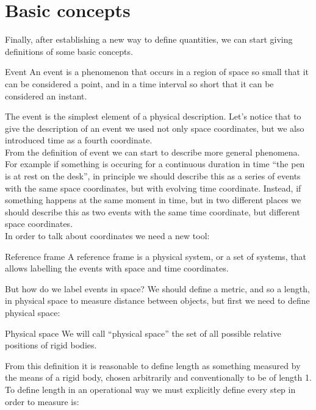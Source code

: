 \section{Basic concepts}
Finally, after establishing a new way to define quantities, we can start giving definitions of some basic concepts.
\begin{definition}{Event}
  An event is a phenomenon that occurs in a region of space so small that it can be considered a point, and in a time interval so short that it can be considered an instant.
\end{definition}
The event is the simplest element of a physical description. Let's notice that to give the description of an event we used not only space coordinates, but we also introduced time as a fourth coordinate.\\
From the definition of event we can start to describe more general phenomena. For example if something is occuring for a continuous duration in time ``the pen is at rest on the desk'', in principle we should describe this as a series of events with the same space coordinates, but with evolving time coordinate. Instead, if something happens at the same moment in time, but in two different places we should describe this as two events with the same time coordinate, but different space coordinates.\\
In order to talk about coordinates we need a new tool:
\begin{definition}{Reference frame}
  A reference frame is a physical system, or a set of systems, that allows labelling the events with space and time coordinates.
\end{definition}
But how do we label events in space? We should define a metric, and so a length, in physical space to measure distance between objects, but first we need to define physical space:
\begin{definition}{Physical space}
  We will call ``physical space'' the set of all possible relative positions of rigid bodies.
\end{definition}
From this definition it is reasonable to define length as something measured by the means of a rigid body, chosen arbitrarily and conventionally to be of length 1. To define length in an operational way we must explicitly define every step in order to measure is:

